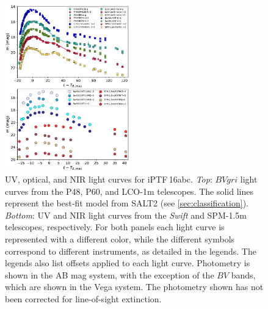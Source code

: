 \documentclass[twocolumn]{aastex61}
\newcommand{\abc}{iPTF\,16abc}
\begin{document}
\begin{figure}[ht]
  \centering
  \includegraphics[width=0.48\textwidth]{lightcurve.pdf}
  \caption{UV, optical, and NIR light curves for \abc. 
  \textit{Top}: $BVgri$ light curves from the P48, P60, and LCO-1m 
  telescopes. The solid lines represent the best-fit model from 
  SALT2 (see \ref{sec:classification}).
  \textit{Bottom}: UV and NIR light curves from the \textit{Swift} 
  and SPM-1.5m telescopes, respectively.
  For both panels each light curve is represented with a different 
  color, while the different symbols correspond to different 
  instruments, as detailed in the legends. The legends also list 
  offsets applied to each light curve. Photometry is shown in the 
  AB mag system, with the exception of the $BV$ bands, which are 
  shown in the Vega system. The photometry shown has not been 
  corrected for line-of-sight extinction.
  }
  \label{fig:ugly_LC}
\end{figure}



\end{document}
